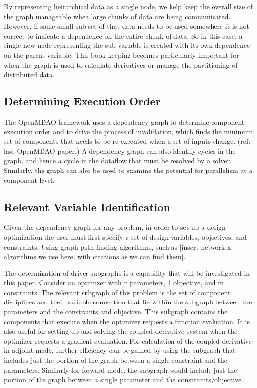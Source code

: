 \documentclass[]{aiaa-tc} %
\begin{document}
    By representing heirarchical data as a single node, we help keep the overall size of the graph manageable
    when large chunks of data are being communicated. However, if some small sub-set of that data needs to be
    used somewhere it is not correct to indicate a dependence on the entire chunk of data. So in this case, a
    single new node representing the sub-variable is created with its own dependence on the parent variable.
    This book keeping becomes particularly important for when the graph is used to calculate derivatives or
    manage the partitioning of distributed data.

    \subsection{Determining Execution Order}

    The OpenMDAO framework uses a dependency graph to determine component execution order and to
    drive the process of invalidation, which finds the minimum set of components that needs to
    be re-executed when a set of inputs change. (ref: last OpenMDAO paper.) A dependency graph
    can also identify cycles in the graph, and hence a cycle in the dataflow that must be resolved
    by a solver. Similarly, the graph can also be used to examine the potential for parallelism at
    a component level.

    \subsection{Relevant Variable Identification}
    Given the dependency graph for any problem, in order to set up a design optimization the user
    must first specify a set of design variables, objectives, and constraints. Using graph
    path finding algorithms, such as [insert network x algorithms we use here, with citations as we can find them].

    The determination of driver subgraphs is a capability that will be investigated in this paper.
    Consider an optimizer with n parameters, 1 objective, and m constraints. The relevant
    subgraph of this problem is the set of component disciplines and their variable connection that
    lie within the subgraph between the parameters and the constraints and objective. This subgraph
    contains the components that execute when the optimizer requests a function evaluation. It is
    also useful for setting up and solving the coupled derivative system when the optimizer requests
    a gradient evaluation. For calculation of the coupled derivative in adjoint mode, further
    efficiency can be gained by using the subgraph that includes just the portion of the graph
    between a single constraint and the parameters. Similarly for forward mode, the subgraph would
    include just the portion of the graph between a single parameter and the constraints/objective.
\end{document}
